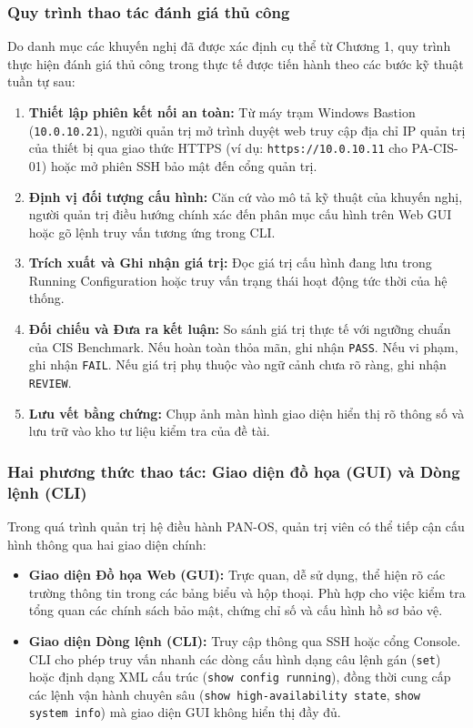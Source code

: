 \documentclass[12pt,a4paper]{article}
\begin{document}
\subsubsection{Quy trình thao tác đánh giá thủ công}
Do danh mục các khuyến nghị đã được xác định cụ thể từ Chương 1, quy trình thực hiện đánh giá thủ công trong thực tế được tiến hành theo các bước kỹ thuật tuần tự sau:
\begin{enumerate}
    \item \textbf{Thiết lập phiên kết nối an toàn:} Từ máy trạm Windows Bastion (\texttt{10.0.10.21}), người quản trị mở trình duyệt web truy cập địa chỉ IP quản trị của thiết bị qua giao thức HTTPS (ví dụ: \texttt{https://10.0.10.11} cho PA-CIS-01) hoặc mở phiên SSH bảo mật đến cổng quản trị.
    \item \textbf{Định vị đối tượng cấu hình:} Căn cứ vào mô tả kỹ thuật của khuyến nghị, người quản trị điều hướng chính xác đến phân mục cấu hình trên Web GUI hoặc gõ lệnh truy vấn tương ứng trong CLI.
    \item \textbf{Trích xuất và Ghi nhận giá trị:} Đọc giá trị cấu hình đang lưu trong Running Configuration hoặc truy vấn trạng thái hoạt động tức thời của hệ thống.
    \item \textbf{Đối chiếu và Đưa ra kết luận:} So sánh giá trị thực tế với ngưỡng chuẩn của CIS Benchmark. Nếu hoàn toàn thỏa mãn, ghi nhận \texttt{PASS}. Nếu vi phạm, ghi nhận \texttt{FAIL}. Nếu giá trị phụ thuộc vào ngữ cảnh chưa rõ ràng, ghi nhận \texttt{REVIEW}.
    \item \textbf{Lưu vết bằng chứng:} Chụp ảnh màn hình giao diện hiển thị rõ thông số và lưu trữ vào kho tư liệu kiểm tra của đề tài.
\end{enumerate}

\subsubsection{Hai phương thức thao tác: Giao diện đồ họa (GUI) và Dòng lệnh (CLI)}
Trong quá trình quản trị hệ điều hành PAN-OS, quản trị viên có thể tiếp cận cấu hình thông qua hai giao diện chính:
\begin{itemize}
    \item \textbf{Giao diện Đồ họa Web (GUI):} Trực quan, dễ sử dụng, thể hiện rõ các trường thông tin trong các bảng biểu và hộp thoại. Phù hợp cho việc kiểm tra tổng quan các chính sách bảo mật, chứng chỉ số và cấu hình hồ sơ bảo vệ.
    \item \textbf{Giao diện Dòng lệnh (CLI):} Truy cập thông qua SSH hoặc cổng Console. CLI cho phép truy vấn nhanh các dòng cấu hình dạng câu lệnh gán (\texttt{set}) hoặc định dạng XML cấu trúc (\texttt{show config running}), đồng thời cung cấp các lệnh vận hành chuyên sâu (\texttt{show high-availability state}, \texttt{show system info}) mà giao diện GUI không hiển thị đầy đủ.
\end{itemize}
\end{document}
